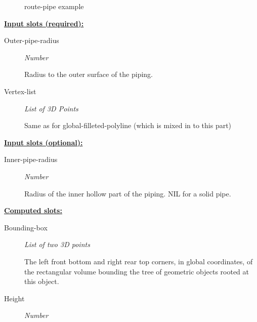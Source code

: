 \documentclass [11pt]{book}
\begin{document}
\begin{itemize}
\begin{figure}
\caption{route-pipe example}

\label{fig:route-pipe}

\end{figure}





\textbf{
\underline{Input slots (required):}}

\begin{description}

\item [Outer-pipe-radius]
\emph{Number}

 Radius to the outer surface of the piping.




\item [Vertex-list]
\emph{List of 3D Points}

 Same as for global-filleted-polyline (which is mixed in to this part)




\end{description}






\textbf{
\underline{Input slots (optional):}}

\begin{description}

\item [Inner-pipe-radius]
\emph{Number}

 Radius of the inner hollow part of the piping. NIL for a solid pipe.




\end{description}






\textbf{
\underline{Computed slots:}}

\begin{description}

\item [Bounding-box]
\emph{List of two 3D points}

 The left front bottom and right rear top corners, in global coordinates,
of the rectangular volume bounding the tree of geometric objects rooted at this object.




\item [Height]
\emph{Number}


\end{description}
\end{itemize}
\end{document}
